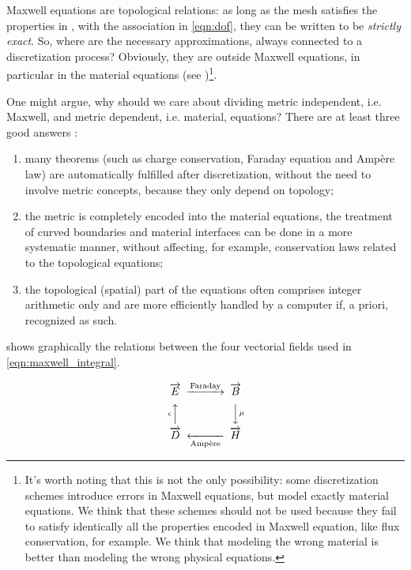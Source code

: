 Maxwell equations are topological relations: as long as
the mesh satisfies the properties in ,
with the association in \eqref{eqn:dof}, they can be written to be
\emph{strictly exact}. So, where are the necessary approximations,
always connected to a discretization process? Obviously, they are
outside Maxwell equations, in particular in the material equations (see
)\footnote{It's worth noting that this
  is not the only possibility: some discretization schemes introduce
  errors in Maxwell equations, but model exactly material
  equations. We think that these schemes should not be used because
  they fail to satisfy identically all the properties encoded in
  Maxwell equation, like flux conservation, for example. We think that
  modeling the wrong material is better than modeling the wrong
  physical equations.}.

One might argue, why should we care about dividing metric independent,
i.e. Maxwell, and metric dependent, i.e. material, equations? There
are at least three good answers \cite{teixeira_geometric}:
\begin{enumerate}
\item
  many theorems (such as charge conservation, Faraday equation and
  Amp\`ere law) are automatically fulfilled after discretization,
  without the need to involve metric concepts, because they only
  depend on topology;
\item
  the metric is completely encoded into the material equations, the
  treatment of curved boundaries and material interfaces can be done
  in a more systematic manner, without affecting, for example,
  conservation laws related to the topological equations;
\item
  the topological (spatial) part of the equations often comprises
  integer arithmetic only and are more efficiently handled by a
  computer if, a priori, recognized as such.
\end{enumerate}

 shows graphically the relations between the
four vectorial fields used in \eqref{eqn:maxwell_integral}.

\begin{equation} \label{dia:relations}
  \begin{CD}
    \E @>{\text{Faraday}}>> \B \\
    @A{\epsilon}AA @VV{\mu}V \\
    \D @<<{\text{Amp\`ere}}< \H
  \end{CD}
\end{equation}

